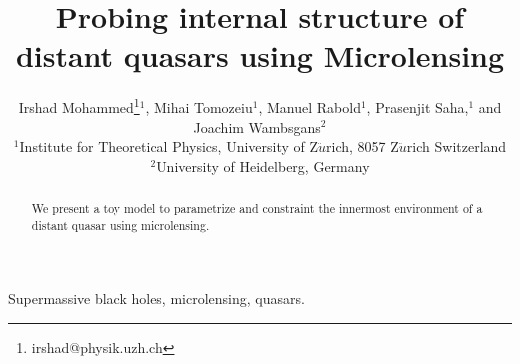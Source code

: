 \documentclass[usenatbib,onecolumn]{mn2e}
\title{Probing internal structure of distant quasars using Microlensing}
\author[I. Mohammed et al.] {Irshad Mohammed\thanks{irshad@physik.uzh.ch}$^1$,
Mihai Tomozeiu$^1$, Manuel Rabold$^1$,  Prasenjit Saha,$^1$ and Joachim Wambsgans$^2$\\
$^1${Institute for Theoretical Physics, University of Z$\ddot{u}$rich, 8057 Z$\ddot{u}$rich Switzerland}\\
$^2${University of Heidelberg, Germany}
}
\begin{document}
\maketitle

\begin{abstract}
We present a toy model to parametrize and constraint the innermost environment of a distant quasar using microlensing. 
\end{abstract}


\begin{keywords}
Supermassive black holes, microlensing, quasars.
\end{keywords}















\citep{2006MNRAS.367.1209L}





\def\apj{ApJ}
\def\apjl{ApJL}
\def\aj{AJ}
\def\mnras{MNRAS}
\def\aap{A\&A}


\end{document}
